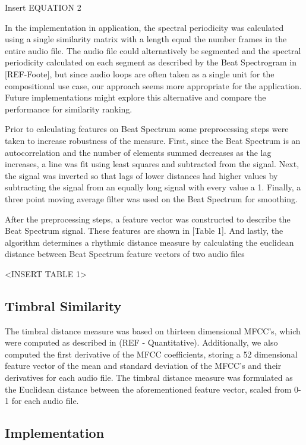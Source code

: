 \documentclass{article}
\begin{document}
Insert EQUATION 2

In the implementation in application, the spectral periodicity was calculated using a single similarity matrix with a length equal the number frames in the entire audio file. The audio file could alternatively be segmented and the spectral periodicity calculated on each segment as described by the Beat Spectrogram in [REF-Foote], but since audio loops are often taken as a single unit for the compositional use case, our approach seems more appropriate for the application. Future implementations might explore this alternative and compare the performance for similarity ranking.

Prior to calculating features on Beat Spectrum some preprocessing steps were taken to increase robustness of the measure. First, since the Beat Spectrum is an autocorrelation and the number of elements summed decreases as the lag increases, a line was fit using least squares and subtracted from the signal. Next, the signal was inverted so that lags of lower distances had higher values by subtracting the signal from an equally long signal with every value a 1. Finally, a three point moving average filter was used on the Beat Spectrum for smoothing.

After the preprocessing steps, a feature vector was constructed to describe the Beat Spectrum signal. These features are shown in [Table 1]. And lastly, the algorithm determines a rhythmic distance measure by calculating the euclidean distance between Beat Spectrum feature vectors of two audio files

<INSERT TABLE 1>

\subsection{Timbral Similarity}

The timbral distance measure was based on thirteen dimensional MFCC’s, which were computed as described in (REF - Quantitative). Additionally, we also computed the first derivative of the MFCC coefficients, storing a 52 dimensional feature vector of the mean and standard deviation of the MFCC’s and their derivatives for each audio file. The timbral distance measure was formulated as the Euclidean distance between the aforementioned feature vector, scaled from 0-1 for each audio file.

\subsection{Implementation}
\end{document}
